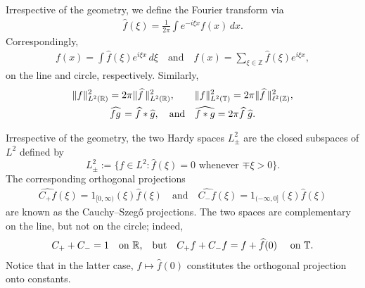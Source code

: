 \documentclass{amsart}
\numberwithin{equation}{section}
\theoremstyle{definition}
\newcommand{\Z}{\mathbb{Z}}
\newcommand{\R}{\mathbb{R}}
\newcommand{\T}{\mathbb{T}}
\newcommand{\qtq}[1]{\quad\text{#1}\quad}
\begin{document}
Irrespective of the geometry, we define the Fourier transform via
\begin{align}\label{FT}
\widehat f(\xi) = \tfrac{1}{2\pi} \int e^{-i\xi x} f(x) \,dx .
\end{align}
Correspondingly, 
\begin{align}\label{IFT}
f(x) = \int \widehat f(\xi)  e^{i\xi x} \,d\xi \qtq{and} f(x) = \sum_{\xi\in\Z} \widehat f(\xi) e^{i\xi x} ,
\end{align}
on the line and circle, respectively. Similarly, 
\begin{gather}\label{Plancherel}
\| f \|_{L^2(\R)}^2 = 2\pi \| \widehat f\, \|_{L^2(\R)}^2,\qquad
	 \| f \|_{L^2(\T)}^2 = 2\pi \| \widehat f \, \|_{\ell^2(\Z)}^2 , \\
\label{Convolution}
\widehat{fg\mkern 2mu} = \widehat{f} * \widehat{g},
	\qtq{and} \widehat{f * g} = 2\pi \widehat f \; \widehat g .
\end{gather}

Irrespective of the geometry, the two Hardy spaces $L^2_\pm$ are the closed subspaces of $L^2$ defined by
\begin{equation}\label{Hardy}
L^2_\pm := \{ f \in L^2 : \widehat f(\xi) =0 \text{ whenever $\mp \xi>0$}\}.
\end{equation}
The corresponding orthogonal projections
\begin{align}\label{CSP}
\widehat{ C_+ f }(\xi)= 1_{[0,\infty)}(\xi) \widehat f(\xi) \qtq{and}  \widehat{ C_- f }(\xi)= 1_{(-\infty,0]}(\xi) \widehat f(\xi)
\end{align}
are known as the Cauchy--Szeg\H{o} projections.  The two spaces are complementary on the line, but not on the circle; indeed,
\begin{align}\label{Cid}
C_++C_-=1 \quad \text{on $\R$,\quad but} \quad C_+ f + C_- f = f + \widehat f(0) \quad \text{ on $\T$.}
\end{align}
Notice that in the latter case, $f\mapsto \widehat f(0)$ constitutes the orthogonal projection onto constants.
\end{document}

